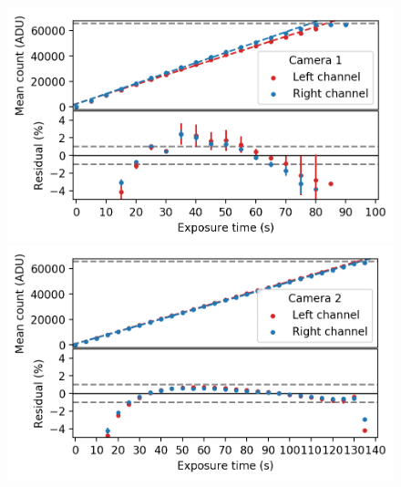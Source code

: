 \begin{colsection}
\begin{colsection}
\begin{figure}[p]
    \begin{center}
        \begin{minipage}[t]{0.49\textwidth}\vspace{10pt}
            \includegraphics[width=\linewidth]{images/detectors/lin_1.png}
        \end{minipage}
        \begin{minipage}[t]{0.49\textwidth}\vspace{10pt}
            \includegraphics[width=\linewidth]{images/detectors/lin_2.png}
        \end{minipage}


\end{center}
\end{figure}
\end{colsection}
\end{colsection}
